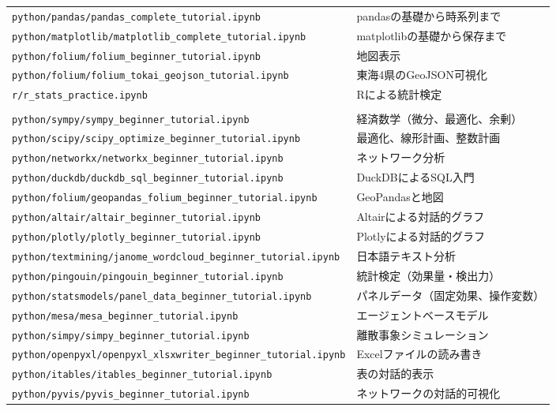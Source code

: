 \documentclass[a4paper,11pt]{ltjsarticle}
\newcommand{\filepath}[1]{\nolinkurl{#1}}
\begin{document}
\begin{longtable}{>{\raggedright\arraybackslash}p{}
                  >{\raggedright\arraybackslash}p{}}
\filepath{python/pandas/pandas_complete_tutorial.ipynb} & pandasの基礎から時系列まで\\
\filepath{python/matplotlib/matplotlib_complete_tutorial.ipynb}
  & matplotlibの基礎から保存まで\\
\filepath{python/folium/folium_beginner_tutorial.ipynb} & 地図表示\\
\filepath{python/folium/folium_tokai_geojson_tutorial.ipynb}
  & 東海4県のGeoJSON可視化\\
\filepath{r/r_stats_practice.ipynb}
  & Rによる統計検定\\
\midrule
\multicolumn{2}{l}{\bfseries 発展ライブラリ}\\
\filepath{python/sympy/sympy_beginner_tutorial.ipynb} & 経済数学（微分、最適化、余剰）\\
\filepath{python/scipy/scipy_optimize_beginner_tutorial.ipynb} & 最適化、線形計画、整数計画\\
\filepath{python/networkx/networkx_beginner_tutorial.ipynb} & ネットワーク分析\\
\filepath{python/duckdb/duckdb_sql_beginner_tutorial.ipynb} & DuckDBによるSQL入門\\
\filepath{python/folium/geopandas_folium_beginner_tutorial.ipynb} & GeoPandasと地図\\
\filepath{python/altair/altair_beginner_tutorial.ipynb} & Altairによる対話的グラフ\\
\filepath{python/plotly/plotly_beginner_tutorial.ipynb} & Plotlyによる対話的グラフ\\
\filepath{python/textmining/janome_wordcloud_beginner_tutorial.ipynb}
  & 日本語テキスト分析\\
\filepath{python/pingouin/pingouin_beginner_tutorial.ipynb} & 統計検定（効果量・検出力）\\
\filepath{python/statsmodels/panel_data_beginner_tutorial.ipynb}
  & パネルデータ（固定効果、操作変数）\\
\filepath{python/mesa/mesa_beginner_tutorial.ipynb} & エージェントベースモデル\\
\filepath{python/simpy/simpy_beginner_tutorial.ipynb} & 離散事象シミュレーション\\
\filepath{python/openpyxl/openpyxl_xlsxwriter_beginner_tutorial.ipynb}
  & Excelファイルの読み書き\\
\filepath{python/itables/itables_beginner_tutorial.ipynb} & 表の対話的表示\\
\filepath{python/pyvis/pyvis_beginner_tutorial.ipynb} & ネットワークの対話的可視化\\

\end{longtable}
\end{document}
